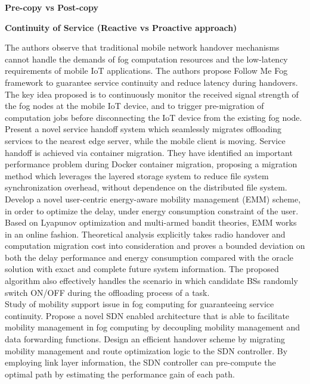 \textbf{Pre-copy vs Post-copy}

\textbf{Continuity of Service (Reactive vs Proactive approach)}

\cite{bao2017follow}
The authors observe that traditional mobile network handover mechanisms cannot handle the demands of fog computation resources and the low-latency requirements of mobile IoT applications. The authors propose Follow Me Fog framework to guarantee service continuity and reduce latency during handovers. The key idea proposed is to continuously monitor the received signal strength of the fog nodes at the mobile IoT device, and to trigger pre-migration of computation jobs before disconnecting the IoT device from the existing fog node.\\
\cite{ma2017efficient}
Present a novel service handoff system which seamlessly migrates offloading services to the nearest edge server, while the mobile client is moving. Service handoff is achieved via container migration. They have identified an important performance problem during Docker container migration, proposing a migration method which leverages the layered storage system to reduce file system synchronization overhead, without dependence on the distributed file system.\\
\cite{sun2017emm}
Develop a novel user-centric energy-aware mobility management (EMM) scheme, in order to optimize the delay, under energy consumption constraint of the user. Based on Lyapunov optimization and multi-armed bandit theories, EMM works in an online fashion. Theoretical analysis explicitly takes radio handover and computation migration cost into consideration and proves a bounded deviation on both the delay performance and energy consumption compared with the oracle solution with exact and complete future system information. The proposed algorithm also effectively handles the scenario in which candidate BSs randomly switch ON/OFF during the offloading process of a task.\\
\cite{bi2018mobility}
Study of mobility support issue in fog computing for guaranteeing service continuity. Propose a novel SDN enabled architecture that is able to facilitate mobility management in fog computing by decoupling mobility management and data forwarding functions. Design an efficient handover scheme by migrating mobility management and route optimization logic to the SDN controller. By employing link layer information, the SDN controller can pre-compute the optimal path by estimating the performance gain of each path.\\
